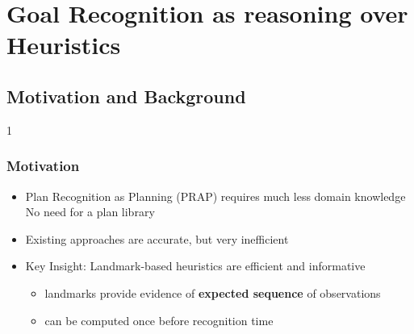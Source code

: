 \documentclass{beamer}
\def\masterclass{1}
\begin{document}
	
\section{Goal Recognition as reasoning over Heuristics}

\subsection{Motivation and Background}
\if\masterclass1
	\begin{frame}[c]\frametitle{Motivation}
		\begin{itemize}
			\item Plan Recognition as Planning (PRAP) requires much less domain knowledge  \\
			No need for a plan library
			\item Existing approaches are accurate, but very inefficient
			\item Key Insight: Landmark-based heuristics are efficient and informative\\
			\begin{itemize}
				\item landmarks provide evidence of \textbf{expected sequence} of observations
				\item can be computed once before recognition time
			\end{itemize}
		\end{itemize}
	\end{frame}
	
\end{document}
